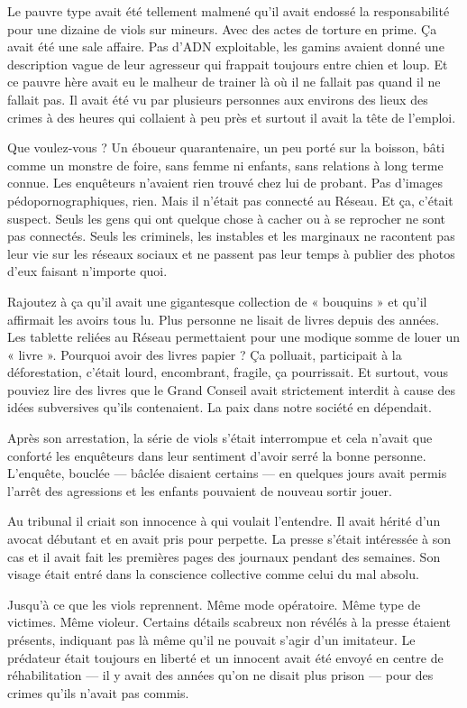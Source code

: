 Le pauvre type avait été tellement malmené qu'il avait endossé la responsabilité
pour une dizaine de viols sur mineurs. Avec des actes de torture en prime. Ça
avait été une sale affaire. Pas d'ADN exploitable, les gamins avaient donné une
description vague de leur agresseur qui frappait toujours entre chien et loup.
Et ce pauvre hère avait eu le malheur de trainer là où il ne fallait pas quand
il ne fallait pas. Il avait été vu par plusieurs personnes aux environs des
lieux des crimes à des heures qui collaient à peu près et surtout il avait la
tête de l'emploi.

Que voulez-vous ? Un éboueur quarantenaire, un peu porté sur la boisson, bâti
comme un monstre de foire, sans femme ni enfants, sans relations à long terme
connue. Les enquêteurs n'avaient rien trouvé chez lui de probant. Pas d'images
pédopornographiques, rien. Mais il n'était pas connecté au Réseau. Et ça,
c'était suspect. Seuls les gens qui ont quelque chose à cacher ou à se
reprocher ne sont pas connectés. Seuls les criminels, les instables et les
marginaux ne racontent pas leur vie sur les réseaux sociaux et ne passent pas
leur temps à publier des photos d'eux faisant n'importe quoi.

Rajoutez à ça qu'il avait une gigantesque collection de « bouquins » et qu'il
affirmait les avoirs tous lu. Plus personne ne lisait de livres depuis des
années. Les tablette reliées au Réseau permettaient pour une modique somme de
louer un « livre ». Pourquoi avoir des livres papier ? Ça polluait, participait
à la déforestation, c'était lourd, encombrant, fragile, ça pourrissait. Et
surtout, vous pouviez lire des livres que le Grand Conseil avait strictement
interdit à cause des idées subversives qu'ils contenaient. La paix dans notre
société en dépendait.

Après son arrestation, la série de viols s'était interrompue et cela n'avait
que conforté les enquêteurs dans leur sentiment d'avoir serré la bonne
personne. L'enquête, bouclée — bâclée disaient certains — en quelques jours
avait permis l'arrêt des agressions et les enfants pouvaient de nouveau sortir
jouer.

Au tribunal il criait son innocence à qui voulait l'entendre. Il avait hérité
d'un avocat débutant et en avait pris pour perpette. La presse s'était
intéressée à son cas et il avait fait les premières pages des journaux pendant
des semaines. Son visage était entré dans la conscience collective comme celui
du mal absolu.

Jusqu'à ce que les viols reprennent. Même mode opératoire. Même type de
victimes. Même violeur. Certains détails scabreux non révélés à la presse
étaient présents, indiquant pas là même qu'il ne pouvait s'agir d'un imitateur.
Le prédateur était toujours en liberté et un innocent avait été envoyé en
centre de réhabilitation — il y avait des années qu'on ne disait plus prison —
pour des crimes qu'ils n'avait pas commis.

